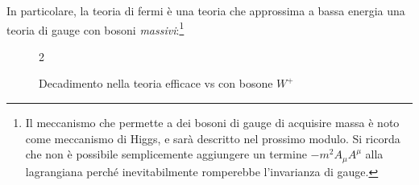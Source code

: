 \documentclass[11pt]{report}
\begin{document}
In particolare, la teoria di fermi è una teoria che approssima a bassa energia una teoria di gauge con bosoni \emph{massivi}:\footnote{Il meccanismo che permette a dei bosoni di gauge di acquisire massa è noto come meccanismo di Higgs, e sarà descritto nel prossimo modulo. Si ricorda che non è possibile semplicemente aggiungere un termine \(-m^2A_\mu A^\mu\) alla lagrangiana perché inevitabilmente romperebbe l'invarianza di gauge.}

\begin{figure}
\caption{Decadimento nella teoria efficace vs con bosone \(W^+\)}
\label{fig:fermivsWbeta}
\begin{multicols}{2}
    \begin{center}
    \end{center}
    \columnbreak
    \begin{center}
    \end{center}
\end{multicols}
\end{figure}
\end{document}
